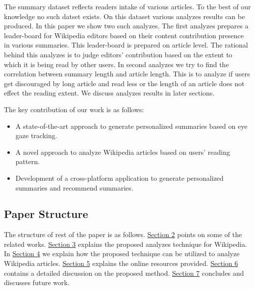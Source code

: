 \documentclass[12pt]{article}
\begin{document}
The summary dataset reflects readers intake of various articles. To the best of our knowledge no such datset exists. On this dataset various analyzes results can be produced. In this paper we show two such analyzes. The first analyzes prepares a leader-board for Wikipedia editors based on their content contribution presence in various summaries. This leader-board is prepared on article level. The rational behind this analyzes is to judge editors' contribution based on the extent to which it is being read by other users. In second analyzes we try to find the correlation between summary length and article length. This is to analyze if users get discouraged by long article and read less or the length of an article does not effect the reading extent. We discuss analyzes results in later sections.  

The key contribution of our work is as follows:
\begin{itemize}
	\item A state-of-the-art approach to generate personalized summaries based on eye gaze tracking.
	\item A novel approach to analyze Wikipedia articles based on users' reading pattern.
	\item Development of a cross-platform application to generate personalized summaries and recommend summaries.	
\end{itemize}


\subsection{Paper Structure}
The structure of rest of the paper is as follows. \hyperref[sec:Related]{Section 2} points on some of the related works. \hyperref[sec:Proposed]{Section 3} explains the proposed analyzes technique for Wikipedia. In \hyperref[sec:Analysis]{Section 4} we explain how the proposed technique can be utilized to analyze Wikipedia articles. \hyperref[sec:Resources]{Section 5} explains the online resources provided. \hyperref[sec:Discussion]{Section 6} contains a detailed discussion on the proposed method. \hyperref[sec:Conclusion]{Section 7} concludes and discusses future work.
\end{document}
